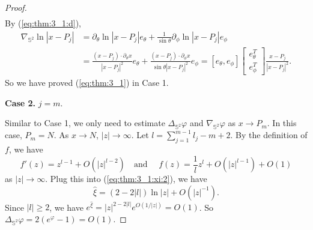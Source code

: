 \documentclass[12pt]{article}
\newcommand{\bS}{\mathbb{S}}
\begin{document}
\begin{proof}
\[\begin{aligned}
	\end{aligned}
	\]
	By (\ref{eq:thm:3_1:d}), 
	\begin{equation*}
	\begin{split}
		\nabla_{\bS^2}\ln |x-P_j| & =\partial_{\theta}\ln |x-P_j| e_{\theta}+\frac{1}{\sin\theta}\partial_{\phi}\ln |x-P_j| e_{\phi}\\
		& =\frac{(x-P_j)\cdot \partial_{\theta}x}{|x-P_j|^2}e_{\theta}+\frac{(x-P_j)\cdot \partial_{\phi}x}{\sin\theta|x-P_j|^2}e_{\phi}=[e_{\theta}, e_{\phi}] \begin{bmatrix}
		e_{\theta}^T\\
		e_{\phi}^T
		\end{bmatrix}\frac{x-P_j}{|x-P_j|^2}. 
	\end{split}
	\end{equation*}
	So we have proved (\ref{eq:thm:3_1}) in Case 1. 

	\noindent\textbf{Case 2.} $j=m$.
	
	Similar to Case 1, we only need to estimate $\Delta_{\bS^2}\varphi$ and $\nabla_{\bS^2}\varphi$ as $x\to P_{m}$. In this case, $P_{m}=N$. As $x\to N$, $|z|\to \infty$. Let $l=\sum_{j=1}^{m-1}l_j-m+2$. By the definition of $f$, we have
	\begin{equation*}
		f'(z)=z^{l-1}+O(|z|^{l-2})\quad \textrm{and }\quad f(z)= \frac{1}{l}z^{l}+O(|z|^{l-1})+O(1) 
	\end{equation*}
	as $|z|\to \infty$. Plug this into (\ref{eq:thm:3_1:xi:2}), we have 
	\begin{equation}\label{eq:thm:3_1:xi:5}
		\hat{\xi}=(2-2|l|)\ln |z|+O(|z|^{-1}). 
	\end{equation}
	Since $|l|\ge 2$, we have $e^{\hat{\xi}}=|z|^{2-2|l|}e^{O(1/|z|)}=O(1)$. So $\Delta_{\bS^2}\varphi=2(e^{\varphi}-1)=O(1)$.


\end{proof}
\end{document}
